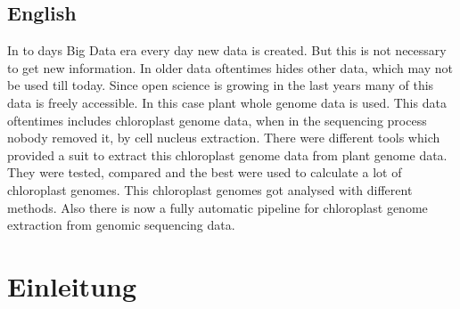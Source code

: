 \documentclass{scrartcl}
\begin{document}
\subsection{English}
\label{sec-1-2}
In to days Big Data era every day new data is created. But this is not necessary to get new information. In older data oftentimes hides other data, which may not be used till today.
Since open science is growing in the last years many of this data is freely accessible. In this case plant whole genome data is used. This data oftentimes includes chloroplast
genome data, when in the sequencing process nobody removed it, by cell nucleus extraction. There were different tools which provided a suit to extract this chloroplast genome data from plant
genome data. They were tested, compared and the best were used to calculate a lot of chloroplast genomes. This chloroplast genomes got analysed with different methods. Also there is now
a fully automatic pipeline for chloroplast genome extraction from genomic sequencing data.
\clearpage

\section{Einleitung}
\label{sec-2}
\end{document}
